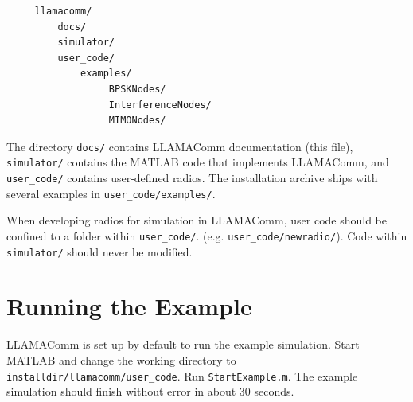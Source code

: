 \begin{verbatim}
     llamacomm/
         docs/
         simulator/
         user_code/
             examples/
                  BPSKNodes/
                  InterferenceNodes/
                  MIMONodes/
\end{verbatim}

The directory \verb+docs/+ contains LLAMAComm documentation (this
file), \verb+simulator/+ contains the MATLAB code that implements
LLAMAComm, and \verb+user_code/+ contains user-defined radios.  The
installation archive ships with several examples in \verb+user_code/examples/+.

When developing radios for simulation in LLAMAComm, user code should
be confined to a folder within \verb+user_code/+. (e.g.
\verb+user_code/newradio/+).
Code within
\verb+simulator/+ should never be modified.

\section{Running the Example}

LLAMAComm is set up by default to run the example simulation.  Start
MATLAB and change the working directory to
\verb+installdir/llamacomm/user_code+. Run \verb+StartExample.m+. The example
simulation should finish without error in about 30 seconds.

